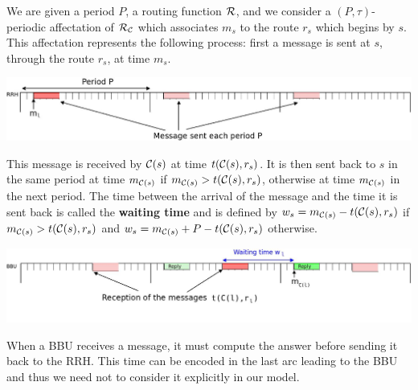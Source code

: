 \documentclass[a4paper,10pt]{article}
\begin{document}
       We are given a period $P$, a routing function ${\cal R}$, and we consider a $(P,\tau)$-periodic affectation of ${\cal R}_{\cal C}$ which associates $m_s$ to the route $r_s$ which begins by $s$.  This affectation represents the following process: first a message is sent at $s$, through the route $r_s$, at time $m_s$.
      
%       
      
      
      \begin{center}
      \includegraphics[scale=0.2]{rrh.jpeg}
      \end{center}
      
      

      This message is received by ${\cal C}(s)$ at time $t({\cal C}(s),r_s)$. It is then sent back to $s$ in the same period at time $m_{{\cal C}(s)}$ if $m_{{\cal C}(s)} > t({\cal C}(s),r_s)$, otherwise at time $m_{{\cal C}(s)}$ in the next period. The time between the arrival of the message and the time it is sent back is called the \textbf{waiting time} and is defined by $w_s = m_{{\cal C}(s)} - t({\cal C}(s),r_s)$ if $m_{{\cal C}(s)} > t({\cal C}(s),r_s)$ and $w_s = m_{{\cal C}(s)} + P - t({\cal C}(s),r_s)$ otherwise.
      
       \begin{center}

      
      \includegraphics[scale=0.2]{BBU2.jpeg}
      \end{center}
     

      When a BBU receives a message, it must compute the answer before sending it back to the RRH. This time can be encoded
      in the last arc leading to the BBU and thus we need not to consider it explicitly in our model.
    
\end{document}
